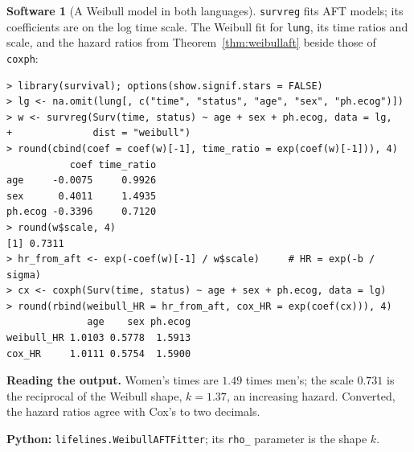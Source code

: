 \documentclass[11pt,a4paper]{article}
\numberwithin{equation}{section}
\theoremstyle{definition}
\newtheorem{software}[thm]{Software}
\begin{document}
\begin{software}[A Weibull model in both languages]
\label{sw:aftlung}
\texttt{survreg} fits AFT models; its coefficients are on the log time scale. The Weibull fit for \texttt{lung}, its time ratios and scale, and the hazard ratios from Theorem~\ref{thm:weibullaft} beside those of \texttt{coxph}:
{\small\begin{verbatim}
> library(survival); options(show.signif.stars = FALSE)
> lg <- na.omit(lung[, c("time", "status", "age", "sex", "ph.ecog")])
> w <- survreg(Surv(time, status) ~ age + sex + ph.ecog, data = lg,
+              dist = "weibull")
> round(cbind(coef = coef(w)[-1], time_ratio = exp(coef(w)[-1])), 4)
           coef time_ratio
age     -0.0075     0.9926
sex      0.4011     1.4935
ph.ecog -0.3396     0.7120
> round(w$scale, 4)
[1] 0.7311
> hr_from_aft <- exp(-coef(w)[-1] / w$scale)     # HR = exp(-b / sigma)
> cx <- coxph(Surv(time, status) ~ age + sex + ph.ecog, data = lg)
> round(rbind(weibull_HR = hr_from_aft, cox_HR = exp(coef(cx))), 4)
              age    sex ph.ecog
weibull_HR 1.0103 0.5778  1.5913
cox_HR     1.0111 0.5754  1.5900
\end{verbatim}}
\textbf{Reading the output.} Women's times are $1.49$ times men's; the scale $0.731$ is the reciprocal of the Weibull shape, $k = 1.37$, an increasing hazard. Converted, the hazard ratios agree with Cox's to two decimals.

\textbf{Python:} \texttt{lifelines.WeibullAFTFitter}; its \texttt{rho\_} parameter is the shape $k$.
\end{software}
\end{document}
